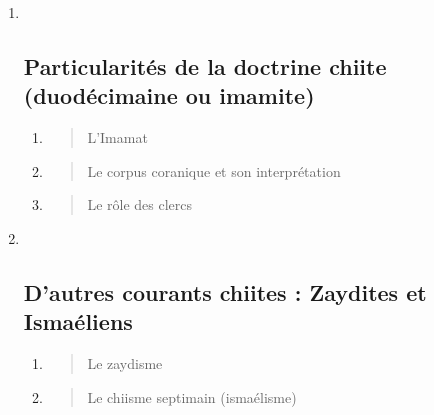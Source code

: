 \begin{enumerate}
\def\labelenumi{\Roman{enumi}.}
\setcounter{enumi}{2}
\item ~
  \hypertarget{particularituxe9s-de-la-doctrine-chiite-duoduxe9cimaine-ou-imamite}{%
  \subsection{\texorpdfstring{{Particularités de la doctrine
  chiite (duodécimaine ou
  imamite)}}{Particularités de la doctrine chiite (duodécimaine ou imamite)}}\label{particularituxe9s-de-la-doctrine-chiite-duoduxe9cimaine-ou-imamite}}

  \begin{enumerate}
  \def\labelenumii{\arabic{enumii}.}
  \item
    \begin{quote}
    L'Imamat
    \end{quote}
  \item
    \begin{quote}
    Le corpus coranique et son interprétation
    \end{quote}
  \item
    \begin{quote}
    Le rôle des clercs
    \end{quote}
  \end{enumerate}
\item ~
  \hypertarget{dautres-courants-chiites-zaydites-et-ismauxe9liens}{%
  \subsection{\texorpdfstring{{D'autres courants chiites :
  Zaydites et
  Ismaéliens}}{D'autres courants chiites : Zaydites et Ismaéliens}}\label{dautres-courants-chiites-zaydites-et-ismauxe9liens}}

  \begin{enumerate}
  \def\labelenumii{\arabic{enumii}.}
  \item
    \begin{quote}
    Le zaydisme
    \end{quote}
  \item
    \begin{quote}
    Le chiisme septimain (ismaélisme)
    \end{quote}
  \end{enumerate}
\end{enumerate}

